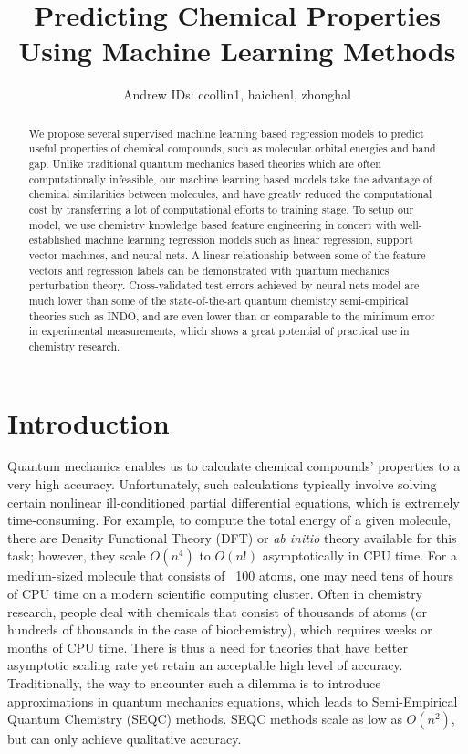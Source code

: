 \documentclass[10pt, oneside]{article}   	%
\title{Predicting Chemical Properties Using Machine Learning Methods}
\author{Andrew IDs: ccollin1, haichenl, zhonghal}
\begin{document}
\maketitle

\begin{abstract}

We propose several supervised machine learning based regression models to predict useful properties of chemical compounds, such as molecular orbital energies and band gap. Unlike traditional quantum mechanics based theories which are often computationally infeasible, our machine learning based models take the advantage of chemical similarities between molecules, and have greatly reduced the computational cost by transferring a lot of computational efforts to training stage. To setup our model, we use chemistry knowledge based feature engineering in concert with well-established machine learning regression models such as linear regression, support vector machines, and neural nets. A linear relationship between some of the feature vectors and regression labels can be demonstrated with quantum mechanics perturbation theory. Cross-validated test errors achieved by neural nets model are much lower than some of the state-of-the-art quantum chemistry semi-empirical theories such as INDO, and are even lower than or comparable to the minimum error in experimental measurements, which shows a great potential of practical use in chemistry research.

\end{abstract}



\section{Introduction}
\noindent Quantum mechanics enables us to calculate chemical compounds' properties to a very high accuracy. Unfortunately, such calculations typically involve solving certain nonlinear ill-conditioned partial differential equations, which is extremely time-consuming. For example, to compute the total energy of a given molecule, there are Density Functional Theory (DFT) or \textit{ab initio} theory available for this task; however, they scale $O(n^4)$ to $O(n!)$ asymptotically in CPU time. For a medium-sized molecule that consists of ~100 atoms, one may need tens of hours of CPU time on a modern scientific computing cluster. Often in chemistry research, people deal with chemicals that consist of thousands of atoms (or hundreds of thousands in the case of biochemistry), which requires weeks or months of CPU time. There is thus a need for theories that have better asymptotic scaling rate yet retain an acceptable high level of accuracy. Traditionally, the way to encounter such a dilemma is to introduce approximations in quantum mechanics equations, which leads to Semi-Empirical Quantum Chemistry (SEQC) methods. SEQC methods scale as low as $O(n^2)$, but can only achieve qualitative accuracy.
\end{document}
